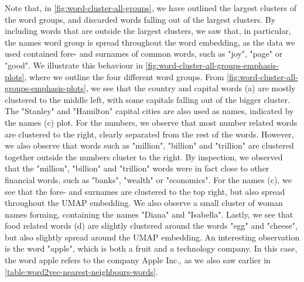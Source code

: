Note that, in \cref{fig:word-cluster-all-groups}, we have outlined the largest clusters of the word groups, and discarded words falling out of the largest clusters. By including words that are outside the largest clusters, we saw that, in particular, the names word group is spread throughout the word embedding, as the data we used contained fore- and surnames of common words, such as "joy", "page" or "good". We illustrate this behaviour in \cref{fig:word-cluster-all-groups-emphasis-plots}, where we outline the four different word groups. From \cref{fig:word-cluster-all-groups-emphasis-plots}, we see that the country and capital words (a) are mostly clustered to the middle left, with some capitals falling out of the bigger cluster. The "Stanley" and "Hamilton" capital cities are also used as names, indicated by the names (c) plot. For the numbers, we observe that most number related words are clustered to the right, clearly separated from the rest of the words. However, we also observe that words such as "million", "billion" and "trillion" are clustered together outside the numbers cluster to the right. By inspection, we observed that the "million", "billion" and "trillion" words were in fact close to other financial words, such as "banks", "wealth" or "economics". For the names (c), we see that the fore- and surnames are clustered to the top right, but also spread throughout the UMAP embedding. We also observe a small cluster of woman names forming, containing the names "Diana" and "Isabella". Lastly, we see that food related words (d) are slightly clustered around the words "egg" and "cheese", but also slightly spread around the UMAP embedding. An interesting observation is the word "apple", which is both a fruit and a technology company. In this case, the word apple refers to the company Apple Inc., as we also saw earlier in \cref{table:word2vec-nearest-neighbours-words}.
